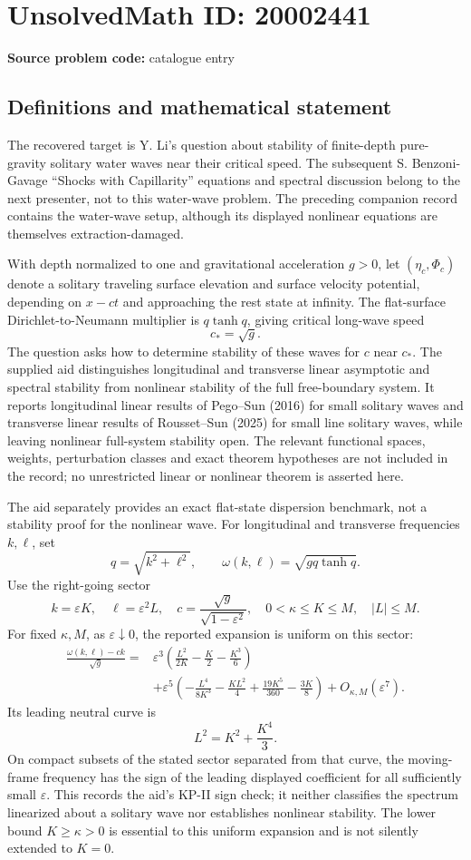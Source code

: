 \documentclass[11pt]{article}
\begin{document}
\section*{UnsolvedMath ID: 20002441}
\textbf{Source problem code:} catalogue entry
\subsection{Definitions and mathematical statement}
The recovered target is Y. Li's question about stability of finite-depth pure-gravity solitary water waves near their critical speed. The subsequent S. Benzoni-Gavage ``Shocks with Capillarity'' equations and spectral discussion belong to the next presenter, not to this water-wave problem. The preceding companion record contains the water-wave setup, although its displayed nonlinear equations are themselves extraction-damaged.

With depth normalized to one and gravitational acceleration $g>0$, let $(\eta_c,\Phi_c)$ denote a solitary traveling surface elevation and surface velocity potential, depending on $x-ct$ and approaching the rest state at infinity. The flat-surface Dirichlet-to-Neumann multiplier is $q\tanh q$, giving critical long-wave speed
\[
 c_* =\sqrt g.
\]
The question asks how to determine stability of these waves for $c$ near $c_*$. The supplied aid distinguishes longitudinal and transverse linear asymptotic and spectral stability from nonlinear stability of the full free-boundary system. It reports longitudinal linear results of Pego--Sun (2016) for small solitary waves and transverse linear results of Rousset--Sun (2025) for small line solitary waves, while leaving nonlinear full-system stability open. The relevant functional spaces, weights, perturbation classes and exact theorem hypotheses are not included in the record; no unrestricted linear or nonlinear theorem is asserted here.

The aid separately provides an exact flat-state dispersion benchmark, not a stability proof for the nonlinear wave. For longitudinal and transverse frequencies $k,\ell$, set
\[
 q=\sqrt{k^2+\ell^2},\qquad
 \omega(k,\ell)=\sqrt{gq\tanh q}.
\]
Use the right-going sector
\[
 k=\varepsilon K,\quad\ell=\varepsilon^2L,\quad
 c=\frac{\sqrt g}{\sqrt{1-\varepsilon^2}},\quad
 0<\kappa\le K\le M,\quad |L|\le M.
\]
For fixed $\kappa,M$, as $\varepsilon\downarrow0$, the reported expansion is uniform on this sector:
\[
\begin{split}
 \frac{\omega(k,\ell)-ck}{\sqrt g}
 ={}&\varepsilon^3
    \left(\frac{L^2}{2K}-\frac K2-\frac{K^3}{6}\right)\\
 &+\varepsilon^5
    \left(-\frac{L^4}{8K^3}-\frac{KL^2}{4}
          +\frac{19K^5}{360}-\frac{3K}{8}\right)
   +O_{\kappa,M}(\varepsilon^7).
\end{split}
\]
Its leading neutral curve is
\[
 L^2=K^2+\frac{K^4}{3}.
\]
On compact subsets of the stated sector separated from that curve, the moving-frame frequency has the sign of the leading displayed coefficient for all sufficiently small $\varepsilon$. This records the aid's KP-II sign check; it neither classifies the spectrum linearized about a solitary wave nor establishes nonlinear stability. The lower bound $K\ge\kappa>0$ is essential to this uniform expansion and is not silently extended to $K=0$.
\end{document}
